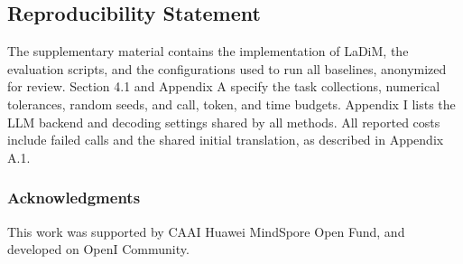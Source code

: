 \documentclass{article}
\begin{document}
\subsection*{Reproducibility Statement}
The supplementary material contains the implementation of LaDiM, the evaluation scripts, and the configurations used to run all baselines, anonymized for review. Section 4.1 and Appendix A specify the task collections, numerical tolerances, random seeds, and call, token, and time budgets. Appendix I lists the LLM backend and decoding settings shared by all methods. All reported costs include failed calls and the shared initial translation, as described in Appendix A.1.

\ificlrfinal

\subsubsection*{Acknowledgments}
This work was supported by CAAI Huawei MindSpore Open Fund, and developed on OpenI Community.
\fi


\clearpage
\appendix
{}

\end{document}
